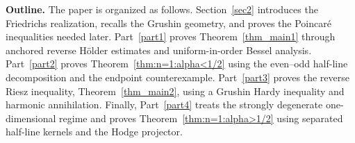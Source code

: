 \documentclass[12pt]{amsart}
\begin{document}
\noindent\textbf{Outline.}
The paper is organized as follows. Section~\ref{sec2} introduces the
Friedrichs realization, recalls the Grushin geometry, and proves the
Poincar\'e inequalities needed later. Part~\ref{part1} proves
Theorem~\ref{thm_main1} through anchored reverse H\"older estimates and uniform-in-order Bessel analysis. Part~\ref{part2} proves
Theorem~\ref{thm:n=1:alpha<1/2} using the even--odd half-line decomposition and the endpoint counterexample. Part~\ref{part3} proves the reverse Riesz inequality, Theorem~\ref{thm_main2}, using a Grushin Hardy inequality and harmonic annihilation. Finally, Part~\ref{part4} treats the strongly degenerate one-dimensional regime and proves Theorem~\ref{thm:n=1:alpha>1/2} using separated half-line kernels and the Hodge projector.








\end{document}

